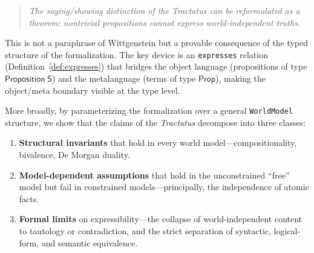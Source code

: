 \documentclass[10pt, letterpaper]{article}
\theoremstyle{definition}
\theoremstyle{remark}
\newcommand{\Sach}{\mathsf{S}}
\newcommand{\Prop}{\mathsf{Prop}}
\begin{document}
\begin{quote}
\emph{The saying/showing distinction of the \emph{Tractatus} can
be reformulated as a theorem: nontrivial propositions cannot
express world-independent truths.}
\end{quote}

\noindent
This is not a paraphrase of Wittgenstein but a provable
consequence of the typed structure of the formalization.
The key device is an \texttt{expresses} relation (Definition~\ref{def:expresses})
that bridges the object language (propositions of type
$\mathsf{Proposition}\;\Sach$) and the metalanguage (terms of
type $\Prop$), making the object/meta boundary visible at the
type level.

More broadly, by parameterizing the formalization over a general
\texttt{WorldModel} structure, we show that the claims of the
\emph{Tractatus} decompose into three classes:
\begin{enumerate}[nosep]
  \item \textbf{Structural invariants} that hold in every world
    model---compositionality, bivalence, De Morgan duality.
  \item \textbf{Model-dependent assumptions} that hold in the
    unconstrained ``free'' model but fail in constrained
    models---principally, the independence of atomic facts.
  \item \textbf{Formal limits} on expressibility---the collapse
    of world-independent content to tautology or contradiction,
    and the strict separation of syntactic, logical-form, and
    semantic equivalence.
\end{enumerate}
\end{document}
